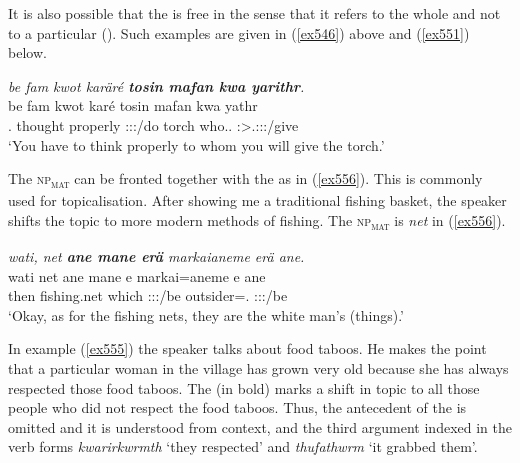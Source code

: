 It is also possible that the  is free in the sense that it refers to the whole  and not to a particular  (\citealt[213]{Andrews:2007relclauses}). Such examples are given in (\ref{ex546}) above and (\ref{ex551}) below.

\begin{exe}
	\ex \emph{be fam kwot karäré \textbf{tosin mafan kwa yarithr}.}\\
	\gll be fam kwot karé tosin mafan kwa yathr\\
	\Ssg.\Erg{} thought properly \Ssg:\Sbj:\Imp:\Ipfv/do torch who.\Sg.\Dat{} \Fut{} \Stsg:\Sbj>\Tsg.\Masc:\Io:\Nonpast:\Ipfv/give\\
	\trans `You have to think properly to whom you will give the torch.'
	\label{ex551}
\end{exe}

The \textsc{np}\textsubscript{\textsc{mat}} can be fronted together with the  as in (\ref{ex556}). This is commonly used for topicalisation. After showing me a traditional fishing basket, the speaker shifts the topic to more modern methods of fishing. The \textsc{np}\textsubscript{\textsc{mat}} is \emph{net} in (\ref{ex556}).

\begin{exe}
	\ex \emph{wati, net \textbf{ane mane erä} markaianeme erä ane.}\\
	\gll wati net ane mane e markai=aneme e ane\\
	then {fishing.net} \Dem{} which \Stpl:\Sbj:\Nonpast:\Ipfv/be {outsider}=\Poss.\Nsg{} \Stpl:\Sbj:\Nonpast:\Ipfv/be \Dem\\
	\trans `Okay, as for the fishing nets, they are the white man's (things).'\\
	\label{ex556}
\end{exe}

In example (\ref{ex555}) the speaker talks about food taboos. He makes the point that a particular woman in the village has grown very old because she has always respected those food taboos. The  (in bold) marks a shift in topic to all those people who did not respect the food taboos. Thus, the antecedent of the  is omitted and it is understood from context, and the third  argument indexed in the verb forms \emph{kwarirkwrmth} `they respected' and \emph{thufathwrm} `it grabbed them'.

